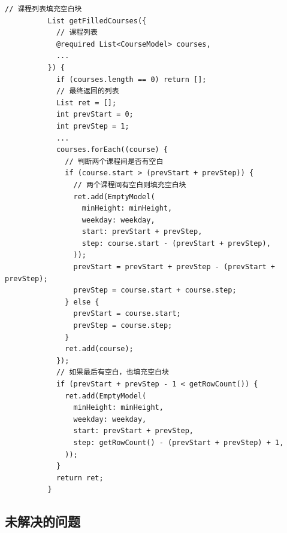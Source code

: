 \documentclass{article}
\begin{document}
\begin{enumerate}
        \begin{lstlisting}[frame=shadowbox]
          // 课程列表填充空白块
          List getFilledCourses({
            // 课程列表
            @required List<CourseModel> courses,
            ...
          }) {
            if (courses.length == 0) return [];
            // 最终返回的列表
            List ret = [];
            int prevStart = 0;
            int prevStep = 1;
            ...
            courses.forEach((course) {
              // 判断两个课程间是否有空白
              if (course.start > (prevStart + prevStep)) {
                // 两个课程间有空白则填充空白块
                ret.add(EmptyModel(
                  minHeight: minHeight,
                  weekday: weekday,
                  start: prevStart + prevStep,
                  step: course.start - (prevStart + prevStep),
                ));
                prevStart = prevStart + prevStep - (prevStart + prevStep);
                prevStep = course.start + course.step;
              } else {
                prevStart = course.start;
                prevStep = course.step;
              }
              ret.add(course);
            });
            // 如果最后有空白，也填充空白块
            if (prevStart + prevStep - 1 < getRowCount()) {
              ret.add(EmptyModel(
                minHeight: minHeight,
                weekday: weekday,
                start: prevStart + prevStep,
                step: getRowCount() - (prevStart + prevStep) + 1,
              ));
            }
            return ret;
          }
        \end{lstlisting}
    \end{enumerate}

  \subsection{未解决的问题}
\end{document}
